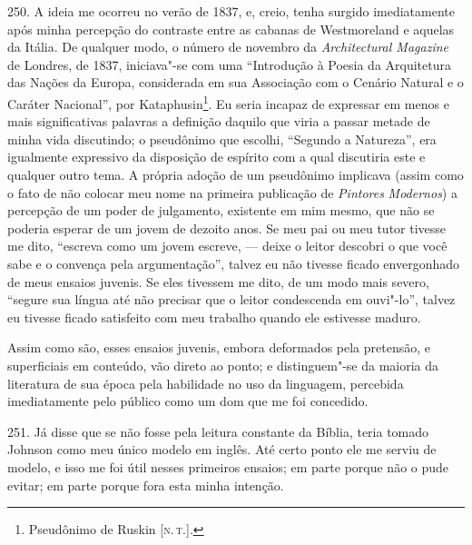 250. A ideia me ocorreu no verão de 1837, e, creio, tenha surgido
imediatamente após minha percepção do contraste entre as cabanas de
Westmoreland e aquelas da Itália. De qualquer modo, o número de novembro
da \emph{Architectural Magazine} de Londres, de 1837, iniciava"-se com
uma ``Introdução à Poesia da Arquitetura das Nações da Europa,
considerada em sua Associação com o Cenário Natural e o Caráter
Nacional'', por Kataphusin\footnote{Pseudônimo de Ruskin {[}\textsc{n.\,t.}{]}.}.
Eu seria incapaz de expressar em menos e mais significativas palavras a
definição daquilo que viria a passar metade de minha vida discutindo; o
pseudônimo que escolhi, ``Segundo a Natureza'', era igualmente
expressivo da disposição de espírito com a qual discutiria este e
qualquer outro tema. A própria adoção de um pseudônimo implicava (assim
como o fato de não colocar meu nome na primeira publicação de
\emph{Pintores} \emph{Modernos}) a percepção de um poder de julgamento,
existente em mim mesmo, que não se poderia esperar de um jovem de
dezoito anos. Se meu pai ou meu tutor tivesse me dito, ``escreva como um
jovem escreve, --- deixe o leitor descobri o que você sabe e o convença
pela argumentação'', talvez eu não tivesse ficado envergonhado de meus
ensaios juvenis. Se eles tivessem me dito, de um modo mais severo,
``segure sua língua até não precisar que o leitor condescenda em
ouvi"-lo'', talvez eu tivesse ficado satisfeito com meu trabalho quando
ele estivesse maduro.

Assim como são, esses ensaios juvenis, embora deformados pela pretensão,
e superficiais em conteúdo, vão direto ao ponto; e distinguem"-se da
maioria da literatura de sua época pela habilidade no uso da linguagem,
percebida imediatamente pelo público como um dom que me foi concedido.

251. Já disse que se não fosse pela leitura constante da Bíblia, teria
tomado Johnson como meu único modelo em inglês. Até certo ponto ele me
serviu de modelo, e isso me foi útil nesses primeiros ensaios; em parte
porque não o pude evitar; em parte porque fora esta minha intenção.

